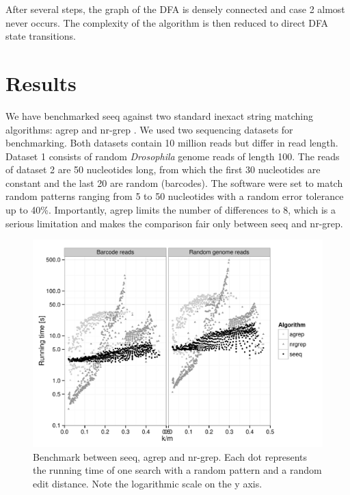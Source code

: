 \documentclass{bioinfo}
\begin{document}
\begin{methods}
After several steps, the graph of the DFA is densely connected and
case 2 almost never occurs. The complexity of the algorithm is then
reduced to direct DFA state transitions.

\end{methods}

\section{Results}

We have benchmarked seeq against two standard inexact string
matching algorithms: agrep \citep{Wu92} and nr-grep \citep{Nav01}. We
used two sequencing datasets for benchmarking. Both datasets contain
10 million reads but differ in read length. Dataset 1 consists of random
\textit{Drosophila} genome reads of length 100. The reads of dataset 2
are 50 nucleotides long, from which the first 30 nucleotides are constant
and the last 20 are random (barcodes). The software were set to match
random patterns ranging from 5 to 50 nucleotides with a random error
tolerance up to 40\%. Importantly, agrep limits the number of differences
to 8, which is a serious limitation and makes the comparison fair only
between seeq and nr-grep.

\begin{figure}[!tpb]
\centerline{\includegraphics[scale=0.5]{results.pdf}}
\caption{Benchmark between seeq, agrep and nr-grep. Each dot represents
the running time of one search with a random pattern and a random
edit distance. Note the logarithmic scale on the y axis.}
\label{fig:results}
\end{figure}
\end{document}
